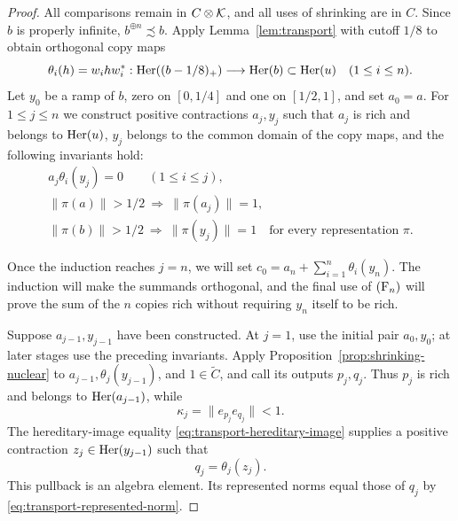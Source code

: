 \begin{proof}
All comparisons remain in \(C\otimes\mathcal K\), and all uses of shrinking
are in \(C\).  Since \(b\) is properly infinite,
\(b^{\oplus n}\precsim b\).  Apply Lemma~\ref{lem:transport} with
cutoff \(1/8\) to obtain orthogonal copy maps
\[
 \theta_i(h)=w_i h w_i^*:
 \operatorname{Her}((b-1/8)_+)\longrightarrow\operatorname{Her}(b)\subset\operatorname{Her}(u)
 \quad(1\le i\le n).
\]
Let \(y_0\) be a ramp of \(b\), zero on \([0,1/4]\) and one on
\([1/2,1]\), and set \(a_0=a\).  For \(1\le j\le n\) we construct
positive contractions \(a_j,y_j\) such that \(a_j\) is rich and
belongs to \(\operatorname{Her}(u)\), \(y_j\) belongs to the common domain of
the copy maps, and the following invariants hold:
\begin{equation}\label{eq:merger-induction}
 \begin{gathered}
 a_j\theta_i(y_j)=0\qquad(1\le i\le j),\\
 \|\pi(a)\|>1/2\ \Longrightarrow\ \|\pi(a_j)\|=1,\\
 \|\pi(b)\|>1/2\ \Longrightarrow\ \|\pi(y_j)\|=1
 \quad\text{for every representation }\pi.
 \end{gathered}
\end{equation}

Once the induction reaches \(j=n\), we will set
\(c_0=a_n+\sum_{i=1}^n\theta_i(y_n)\).  The induction will make the
summands orthogonal, and the final use of \(\textup{(F\ensuremath{_n})}\) will prove the
sum of the \(n\) copies rich without requiring \(y_n\) itself to be
rich.

Suppose \(a_{j-1},y_{j-1}\) have been constructed.  At \(j=1\),
use the initial pair \(a_0,y_0\); at later stages use the preceding
invariants.  Apply
Proposition~\ref{prop:shrinking-nuclear} to
\(a_{j-1},\theta_j(y_{j-1})\), and \(1\in\widetilde C\), and call
its outputs \(p_j,q_j\).  Thus \(p_j\) is rich and belongs to
\(\operatorname{Her}(a_{j-1})\), while
\[
 \kappa_j=\|e_{p_j}e_{q_j}\|<1.
\]
The hereditary-image equality
\eqref{eq:transport-hereditary-image} supplies a positive contraction
\(z_j\in\operatorname{Her}(y_{j-1})\) such that
\begin{equation}\label{eq:merger-pullback}
 q_j=\theta_j(z_j).
\end{equation}
This pullback is an algebra element.  Its represented norms equal
those of \(q_j\) by \eqref{eq:transport-represented-norm}.


\end{proof}
